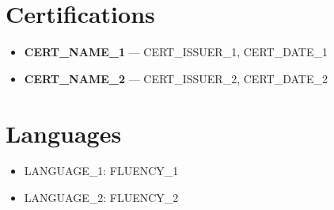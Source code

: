 \documentclass[11pt,letterpaper]{article}
\begin{document}
\section{Certifications}

\begin{itemize}
  \item \textbf{{{CERT_NAME_1}}} --- {{CERT_ISSUER_1}}, {{CERT_DATE_1}}
  \item \textbf{{{CERT_NAME_2}}} --- {{CERT_ISSUER_2}}, {{CERT_DATE_2}}
\end{itemize}

\section{Languages}

\begin{itemize}
  \item {{LANGUAGE_1}}: {{FLUENCY_1}}
  \item {{LANGUAGE_2}}: {{FLUENCY_2}}
\end{itemize}
\end{document}
